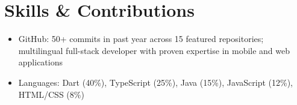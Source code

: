 \section{Skills \& Contributions}

\begin{itemize}[nosep]
  \item GitHub: 50+ commits in past year across 15 featured repositories; multilingual full-stack developer with proven expertise in mobile and web applications
  \item Languages: Dart (40\%), TypeScript (25\%), Java (15\%), JavaScript (12\%), HTML/CSS (8\%)
\end{itemize}
